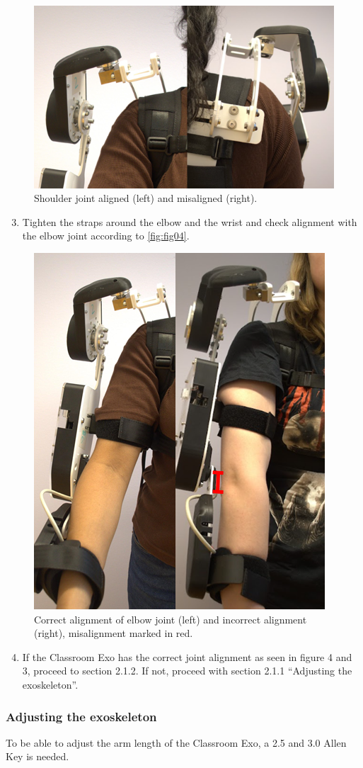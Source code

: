 \begin{figure}[H]
	\centering
	\includegraphics[width=0.4\linewidth]{img/fig_03}
	\caption{Shoulder joint aligned (left) and misaligned (right).}
	\label{fig:fig03}
\end{figure}

\begin{enumerate}[]
	\setcounter{enumi}{2}
	\item Tighten the straps around the elbow and the wrist and check alignment with the elbow joint according to \autoref{fig:fig04}. 
\end{enumerate}

\begin{figure}[H]
	\centering
	\includegraphics[width=0.4\linewidth]{img/fig_04}
	\caption{Correct alignment of elbow joint (left) and incorrect alignment (right), misalignment marked in red.}
	\label{fig:fig04}
\end{figure}

\begin{enumerate}[]
	\setcounter{enumi}{3}
	\item If the Classroom Exo has the correct joint alignment as seen in figure 4 and 3, proceed to section 2.1.2. If not, proceed with section 2.1.1 “Adjusting the exoskeleton”.
\end{enumerate}

\subsubsection{Adjusting the exoskeleton}
To be able to adjust the arm length of the Classroom Exo, a 2.5 and 3.0 Allen Key is needed.

